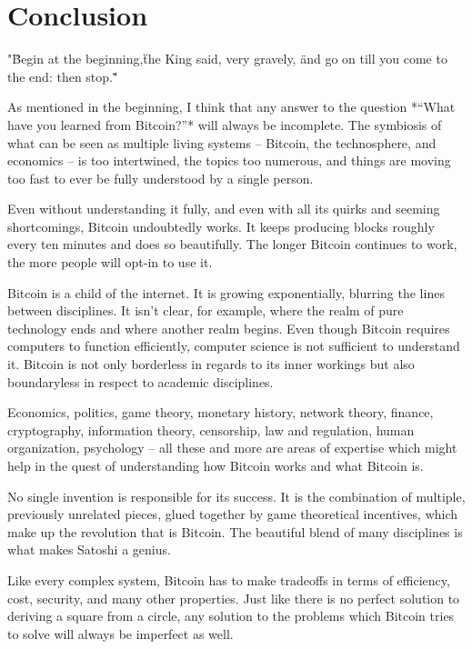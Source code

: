 \chapter{Conclusion}
\label{ch:conclusion}

"\"Begin at the beginning,\" the King said, very gravely, \"and go on till you come to the end: then stop.\""

As mentioned in the beginning, I think that any answer to the question *“What
have you learned from Bitcoin?”* will always be incomplete. The symbiosis of
what can be seen as multiple living systems -- Bitcoin, the technosphere, and
economics -- is too intertwined, the topics too numerous, and things are moving
too fast to ever be fully understood by a single person.

Even without understanding it fully, and even with all its quirks and seeming
shortcomings, Bitcoin undoubtedly works. It keeps producing blocks roughly every
ten minutes and does so beautifully. The longer Bitcoin continues to work, the
more people will opt-in to use it.


Bitcoin is a child of the internet. It is growing exponentially, blurring the
lines between disciplines. It isn’t clear, for example, where the realm of pure
technology ends and where another realm begins. Even though Bitcoin requires
computers to function efficiently, computer science is not sufficient to
understand it. Bitcoin is not only borderless in regards to its inner workings
but also boundaryless in respect to academic disciplines.

Economics, politics, game theory, monetary history, network theory, finance,
cryptography, information theory, censorship, law and regulation, human
organization, psychology -- all these and more are areas of expertise which might
help in the quest of understanding how Bitcoin works and what Bitcoin is.

No single invention is responsible for its success. It is the combination of
multiple, previously unrelated pieces, glued together by game theoretical
incentives, which make up the revolution that is Bitcoin. The beautiful blend of
many disciplines is what makes Satoshi a genius.

Like every complex system, Bitcoin has to make tradeoffs in terms of efficiency,
cost, security, and many other properties. Just like there is no perfect
solution to deriving a square from a circle, any solution to the problems which
Bitcoin tries to solve will always be imperfect as well.

